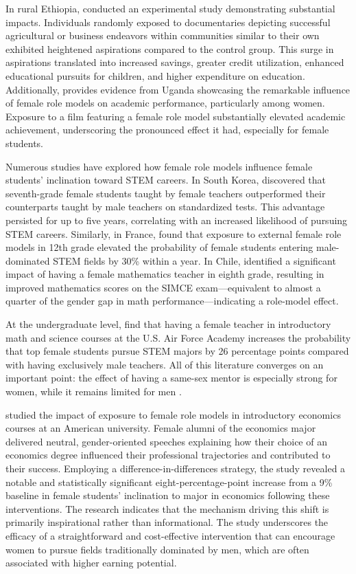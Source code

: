 In rural Ethiopia, \citet{bernard_future_nodate} conducted an experimental study demonstrating substantial impacts. Individuals randomly exposed to documentaries depicting successful agricultural or business endeavors within communities similar to their own exhibited heightened aspirations compared to the control group. This surge in aspirations translated into increased savings, greater credit utilization, enhanced educational pursuits for children, and higher expenditure on education.
Additionally, \citet{riley_role_2024} provides evidence from Uganda showcasing the remarkable influence of female role models on academic performance, particularly among women. Exposure to a film featuring a female role model substantially elevated academic achievement, underscoring the pronounced effect it had, especially for female students.

Numerous studies have explored how female role models influence female students’ inclination toward STEM careers. In South Korea, \citet{lim_persistent_2020} discovered that seventh-grade female students taught by female teachers outperformed their counterparts taught by male teachers on standardized tests. This advantage persisted for up to five years, correlating with an increased likelihood of pursuing STEM careers. Similarly, in France, \citet{breda_female_2020} found that exposure to external female role models in 12th grade elevated the probability of female students entering male-dominated STEM fields by 30\% within a year. In Chile, \citet{paredes_teacher_2014} identified a significant impact of having a female mathematics teacher in eighth grade, resulting in improved mathematics scores on the SIMCE exam—equivalent to almost a quarter of the gender gap in math performance—indicating a role-model effect.

At the undergraduate level, \citet{carrell_sex_2010} find that having a female teacher in introductory math and science courses at the U.S. Air Force Academy increases the probability that top female students pursue STEM majors by 26 percentage points compared with having exclusively male teachers. All of this literature converges on an important point: the effect of having a same-sex mentor is especially strong for women, while it remains limited for men \citep{carrell_sex_2010,paredes_teacher_2014}.

\citet{porter_gender_2020} studied the impact of exposure to female role models in introductory economics courses at an American university. Female alumni of the economics major delivered neutral, gender-oriented speeches explaining how their choice of an economics degree influenced their professional trajectories and contributed to their success. Employing a difference-in-differences strategy, the study revealed a notable and statistically significant eight-percentage-point increase from a 9\% baseline in female students’ inclination to major in economics following these interventions. The research indicates that the mechanism driving this shift is primarily inspirational rather than informational. The study underscores the efficacy of a straightforward and cost-effective intervention that can encourage women to pursue fields traditionally dominated by men, which are often associated with higher earning potential.


